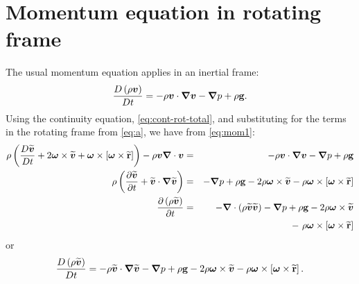 \section{Momentum equation in rotating frame}
The usual momentum equation applies in an inertial frame:
  \begin{equation}\label{eq:mom1}
    \frac{D\left(\rho\boldsymbol{v}\right)}{Dt} = -\rho\boldsymbol{v}\cdot\boldsymbol{\nabla}\boldsymbol{v} - \boldsymbol{\nabla} p + \rho{\bf g}.
  \end{equation}
Using the continuity equation, \ref{eq:cont-rot-total}, and substituting for
the terms in the rotating frame from \ref{eq:a}, we have from \ref{eq:mom1}:
  \begin{eqnarray}
    \rho\left(\frac{D\vbt}{Dt} + 2\ob\times\vbt + \ob\times\left[\ob\times\rbt\right]\right) - \rho\vb\nablab\cdot\vb &=& -\rho\vb\cdot\nablab\vb - \nablab p + \rho\gb \nonumber \\
    \rho\left(\frac{\partial\vbt}{\partial t} + \vbt\cdot\nablab\vbt\right) &=& -\nablab p + \rho\gb - 2\rho\ob\times\vbt - \rho\ob\times\left[\ob\times\rbt\right] \nonumber \\
  \frac{\partial\left(\rho\vbt\right)}{\partial t} &=& -\nablab\cdot\left(\rho\vbt\vbt\right) - \nablab p + \rho\gb - 2\rho\ob\times\vbt \nonumber \\
  & & -\ \rho\ob\times\left[\ob\times\rbt\right]\label{eq:mom-rot}
  \end{eqnarray}
or
  \begin{equation}\label{eq:mom-rot-tot}
    \frac{D\left(\rho\widetilde{\boldsymbol{v}}\right)}{Dt} = -\rho\widetilde{\boldsymbol{v}}\cdot\boldsymbol{\nabla}\widetilde{\boldsymbol{v}} - \boldsymbol{\nabla} p + \rho{\bf g} - 2\rho\boldsymbol{\omega}\times\widetilde{\boldsymbol{v}} - \rho\boldsymbol{\omega}\times\left[\boldsymbol{\omega}\times\widetilde{{\bf r}}\right].
  \end{equation}

